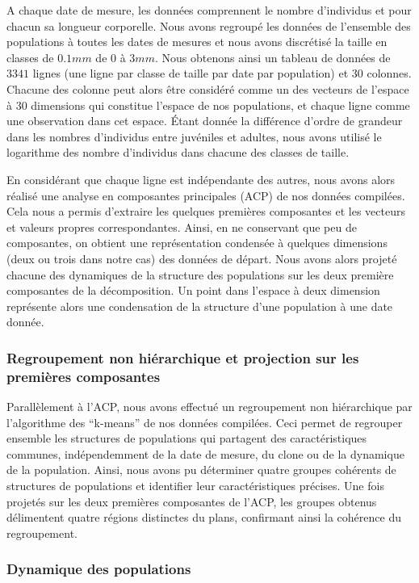 A chaque date de mesure, les données comprennent le nombre d'individus et pour
chacun sa longueur corporelle. Nous avons regroupé les données de l'ensemble des
populations à toutes les dates de mesures et nous avons discrétisé la taille en
classes de $0.1mm$ de $0$ à $3mm$. Nous obtenons ainsi un tableau de données de
$3341$ lignes (une ligne par classe de taille par date par population) et $30$
colonnes. Chacune des colonne peut alors être considéré comme un des vecteurs de
l'espace à $30$ dimensions qui constitue l'espace de nos populations, et chaque
ligne comme une observation dans cet espace. Étant donnée la différence d'ordre
de grandeur dans les nombres d'individus entre juvéniles et adultes, nous avons
utilisé le logarithme des nombre d'individus dans chacune des classes de taille. 

En considérant que chaque ligne est indépendante des autres, nous avons alors
réalisé une analyse en composantes principales (ACP) de nos données compilées.
Cela nous a permis d'extraire les quelques premières composantes et les vecteurs
et valeurs propres correspondantes. Ainsi, en ne conservant que peu de
composantes, on obtient une représentation condensée à quelques dimensions
(deux ou trois dans notre cas) des données de départ. Nous avons alors projeté
chacune des dynamiques de la structure des populations sur les deux première
composantes de la décomposition. Un point dans l'espace à deux dimension
représente alors une condensation de la structure d'une population à une date
donnée. 

\subsubsection{Regroupement non hiérarchique et projection sur les premières
composantes}

Parallèlement à l'ACP, nous avons effectué un regroupement non hiérarchique par
l'algorithme des ``k-means'' de nos données compilées. Ceci permet de regrouper
ensemble les structures de populations qui partagent des caractéristiques
communes, indépendemment de la date de mesure, du clone ou de la dynamique de la
population. Ainsi, nous avons pu déterminer quatre groupes cohérents de
structures de populations et identifier leur caractéristiques précises. Une fois
projetés sur les deux premières composantes de l'ACP, les groupes obtenus
délimentent quatre régions distinctes du plans, confirmant ainsi la cohérence du
regroupement. 
 
\subsubsection{Dynamique des populations}

